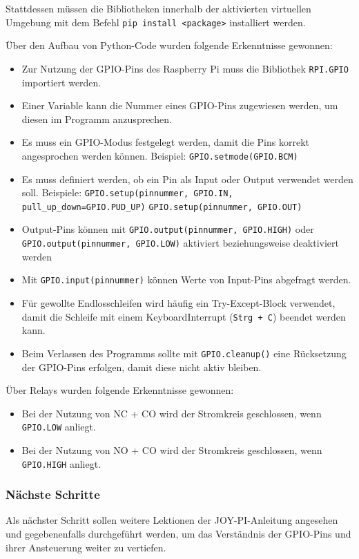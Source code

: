 Stattdessen müssen die Bibliotheken innerhalb der aktivierten virtuellen
Umgebung mit dem Befehl \texttt{pip install <package>} installiert werden.

Über den Aufbau von Python-Code wurden folgende Erkenntnisse gewonnen:
\begin{itemize}
    \item Zur Nutzung der GPIO-Pins des Raspberry Pi muss die Bibliothek
    \texttt{RPI.GPIO} importiert werden.
    \item Einer Variable kann die Nummer eines GPIO-Pins zugewiesen
    werden, um diesen im Programm anzusprechen.
   \item Es muss ein GPIO-Modus festgelegt werden, damit die Pins korrekt
    angesprochen werden können.
    \subitem Beispiel:
    \texttt{GPIO.setmode(GPIO.BCM)}
    \item Es muss definiert werden, ob ein Pin als Input oder Output
    verwendet werden soll.
    \subitem Beispiele:
    \texttt{GPIO.setup(pinnummer, GPIO.IN, pull\_up\_down=GPIO.PUD\_UP)}
    \texttt{GPIO.setup(pinnummer, GPIO.OUT)}
    \item Output-Pins können mit
    \texttt{GPIO.output(pinnummer, GPIO.HIGH)} oder
    \texttt{GPIO.output(pinnummer, GPIO.LOW)}
    aktiviert beziehungsweise deaktiviert werden
    \item Mit \texttt{GPIO.input(pinnummer)} können Werte von Input-Pins
    abgefragt werden.
    \item Für gewollte Endlosschleifen wird häufig ein Try-Except-Block
    verwendet, damit die Schleife mit einem KeyboardInterrupt
    (\texttt{Strg + C}) beendet werden kann.
    \item Beim Verlassen des Programms sollte mit
    \texttt{GPIO.cleanup()} eine Rücksetzung der GPIO-Pins erfolgen,
    damit diese nicht aktiv bleiben.
\end{itemize}

Über Relays wurden folgende Erkenntnisse gewonnen:

\begin{itemize}
    \item Bei der Nutzung von NC + CO wird der Stromkreis geschlossen,
    wenn \texttt{GPIO.LOW} anliegt.
    \item Bei der Nutzung von NO + CO wird der Stromkreis geschlossen,
    wenn \texttt{GPIO.HIGH} anliegt.
\end{itemize}

\subsubsection{Nächste Schritte}
Als nächster Schritt sollen weitere Lektionen der JOY-PI-Anleitung
angesehen und gegebenenfalls durchgeführt werden, um das Verständnis
der GPIO-Pins und ihrer Ansteuerung weiter zu vertiefen.